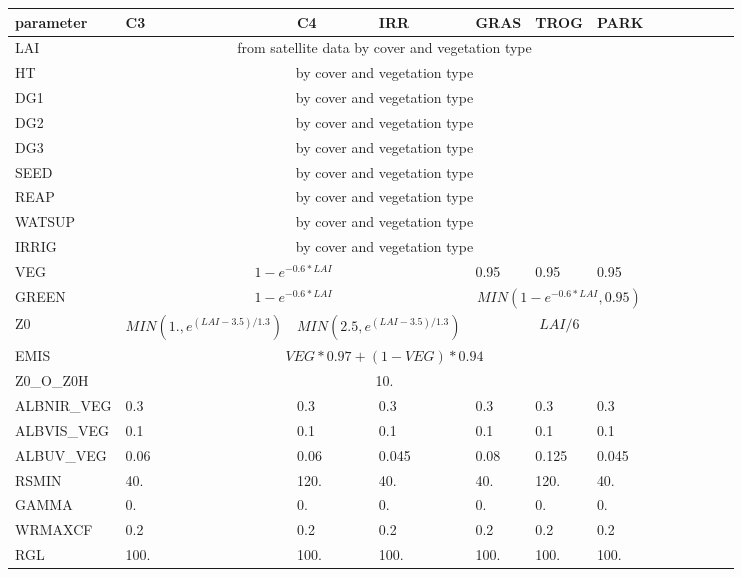 \begin{table}[htbp]
\begin{center}
\begin{tabular}{|l|l|l|l|l|l|l|l|l|l|l|l|l| }
\hline
\textbf{parameter} & \textbf{C3} & \textbf{C4} & \textbf{IRR} & \textbf{GRAS} & \textbf{TROG} & \textbf{PARK} \\
\hline
LAI & \multicolumn{6}{|c|}{from satellite data by cover and vegetation type} \\
\hline
HT &  \multicolumn{6}{|c|}{by cover and vegetation type} \\
\hline
DG1 & \multicolumn{6}{|c|}{by cover and vegetation type} \\
\hline
DG2 & \multicolumn{6}{|c|}{by cover and vegetation type} \\
\hline
DG3 & \multicolumn{6}{|c|}{by cover and vegetation type} \\
\hline
SEED & \multicolumn{6}{|c|}{by cover and vegetation type} \\
\hline
REAP & \multicolumn{6}{|c|}{by cover and vegetation type} \\
\hline
WATSUP & \multicolumn{6}{|c|}{by cover and vegetation type} \\
\hline
IRRIG & \multicolumn{6}{|c|}{by cover and vegetation type} \\
\hline
VEG & \multicolumn{3}{|c|}{$1-e^{-0.6*LAI}$} & 0.95 & 0.95 & 0.95 \\
\hline
GREEN & \multicolumn{3}{|c|}{$1-e^{-0.6*LAI}$} & \multicolumn{3}{|c|}{$MIN(1-e^{-0.6*LAI},0.95)$} \\
\hline
Z0 & $MIN(1.,e^{(LAI-3.5)/1.3})$ & \multicolumn{2}{|c|}{$MIN(2.5,e^{(LAI-3.5)/1.3})$} & \multicolumn{3}{|c|}{$LAI/6$} \\
\hline
EMIS & \multicolumn{6}{|c|}{$VEG*0.97+(1-VEG)*0.94$} \\
\hline
Z0\_O\_Z0H & \multicolumn{6}{|c|}{10.} \\
\hline
ALBNIR\_VEG & 0.3 & 0.3 & 0.3 & 0.3 & 0.3 & 0.3  \\
\hline
ALBVIS\_VEG & 0.1 & 0.1 & 0.1 & 0.1 & 0.1 & 0.1 \\
\hline
ALBUV\_VEG & 0.06 & 0.06 & 0.045 & 0.08 & 0.125 & 0.045 \\
\hline
RSMIN & 40. & 120. & 40. & 40. & 120. & 40. \\
\hline
GAMMA & 0. & 0. & 0. & 0. & 0. & 0. \\
\hline
WRMAXCF & 0.2 & 0.2 & 0.2 & 0.2 & 0.2 & 0.2\\
\hline
RGL & 100. & 100. & 100. & 100. & 100. & 100. \\

\end{tabular}
\end{center}
\end{table}
